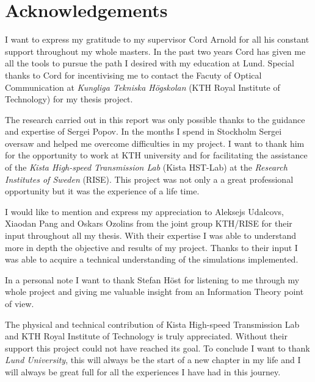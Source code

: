 \chapter*{Acknowledgements}

I want to express my gratitude to my supervisor Cord Arnold for all his constant support throughout my whole masters. In the past two years Cord has given me all the tools to pursue the path I desired with my education at Lund. Special thanks to Cord for incentivising me to contact the Facuty of Optical Communication at \textit{Kungliga Tekniska Högskolan} (KTH Royal Institute of Technology) for my thesis project.	  

The research carried out in this report was only possible thanks to the guidance and expertise of Sergei Popov. In the months I spend in Stockholm Sergei oversaw and helped me overcome difficulties in my project. I want to thank him for the opportunity to work at KTH university and for facilitating the assistance of the \textit{ Kista High-speed Transmission Lab} (Kista HST-Lab) at the \textit{Research Institutes of Sweden} (RISE).	 This project was not only a a great professional opportunity but it was the experience of a life time.

I would like to mention and express my appreciation to Aleksejs Udalcovs, Xiaodan Pang and Oskars Ozolins from the joint group KTH/RISE for their input throughout all my thesis. With their expertise I was able to understand more in depth the objective and results of my project. Thanks to their input I was able to acquire a technical understanding of the simulations implemented.

In a personal note I want to thank Stefan Höst for listening to me through my whole project and giving me valuable insight from an Information Theory point of view.   

The physical and technical contribution of Kista High-speed Transmission Lab and KTH Royal Institute of Technology  is truly appreciated. Without their support  this project could not have reached its goal. To conclude I want to thank \textit{Lund University}, this will always be the start of a new chapter in my life and I will always be great full for all the experiences I have  had in this journey. ~\\


